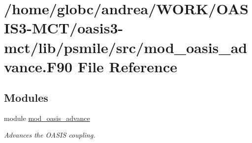 \hypertarget{mod__oasis__advance_8_f90}{}\section{/home/globc/andrea/\+W\+O\+R\+K/\+O\+A\+S\+I\+S3-\/\+M\+C\+T/oasis3-\/mct/lib/psmile/src/mod\+\_\+oasis\+\_\+advance.F90 File Reference}
\label{mod__oasis__advance_8_f90}
\subsection*{Modules}
\begin{DoxyCompactItemize}
\item 
module \hyperlink{namespacemod__oasis__advance}{mod\+\_\+oasis\+\_\+advance}
\begin{DoxyCompactList}\small\item\em Advances the O\+A\+S\+IS coupling. \end{DoxyCompactList}\end{DoxyCompactItemize}
